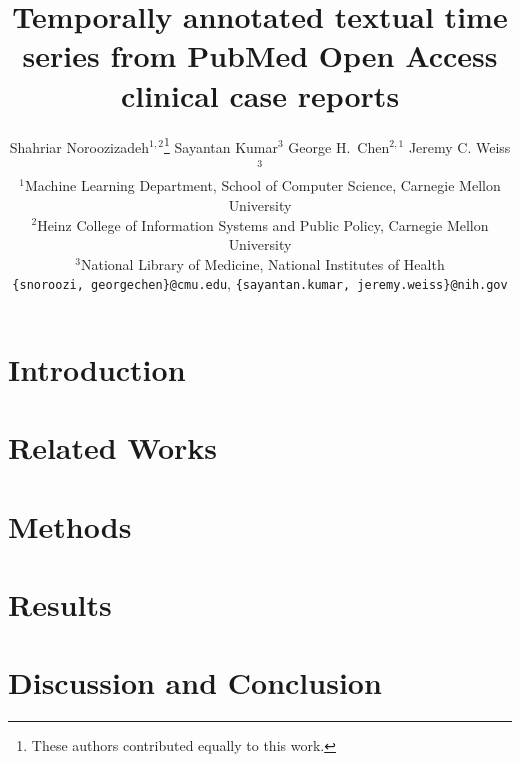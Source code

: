 \documentclass{article}
\title{Temporally annotated textual time series from PubMed Open Access clinical case reports}
\author{%
Shahriar Noroozizadeh$^{1,2}$\thanks{These authors contributed equally to this work.} \quad
Sayantan Kumar$^{3}$\footnotemark[1] \quad
George H.~Chen$^{2,1}$ \quad
Jeremy C. Weiss$^{3}$ \\
$^1$Machine Learning Department, School of Computer Science, Carnegie Mellon University \\
$^2$Heinz College of Information Systems and Public Policy, Carnegie Mellon University \\
$^3$National Library of Medicine, National Institutes of Health \\
\texttt{\{snoroozi, georgechen\}@cmu.edu}, 
\texttt{\{sayantan.kumar, jeremy.weiss\}@nih.gov}
}
\begin{document}



\maketitle


\begin{abstract}

\end{abstract}

\section{Introduction}
\label{sec:intro}


\vspace{-.5em}
\section{Related Works}
\vspace{-.5em}
\label{sec:related_works}


\section{Methods}
\label{sec:methods}


\section{Results}
\label{sec:results}


\section{Discussion and Conclusion}
\label{sec:discussion}

\end{document}
